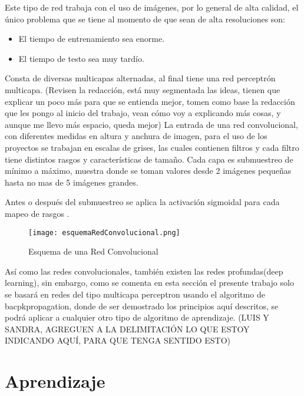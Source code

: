             Este tipo de red trabaja con el uso de imágenes, por lo general de alta calidad, el \'unico problema que se tiene 
            al momento de que sean de alta resoluciones son:
            \begin{itemize}
                \item El tiempo de entrenamiento sea enorme.
                \item El tiempo de testo sea muy tardío.
            \end{itemize}

            Consta de diversas multicapas alternadas, al final tiene una red perceptr\'on multicapa. (Revisen la redacción, está muy segmentada las ideas, tienen que explicar un poco más para que se entienda mejor, tomen como base la redacción que les pongo al inicio del trabajo, vean cómo voy a explicando más cosas, y aunque me llevo más espacio, queda mejor)
            La entrada de una red convolucional, con diferentes medidas en altura y anchura de imagen, para el uso 
            de los proyectos se trabajan en escalas de grises, las cuales contienen filtros y cada filtro tiene distintos 
            rasgos y características de tamaño. Cada capa es submuestreo de m\'inimo a m\'aximo, muestra donde se toman valores 
            desde 2 im\'agenes pequeñas hasta no mas de 5 im\'agenes grandes.

            Antes o despu\'es del submuestreo se aplica la activaci\'on sigmoidal para cada mapeo de rasgos \cite{duran2017}.

            \begin{figure}[H]
                \centering
                \texttt{[image: esquemaRedConvolucional.png]}
                \caption{Esquema de una Red Convolucional \cite{duran2017}}
                \label{fig:fig2}
            \end{figure}

Así como las redes convolucionales, también existen las redes profundas(deep learning), sin embargo, como se comenta en esta sección \label{sec:delimitation} el presente trabajo solo se basará en redes del tipo multicapa perceptron usando el algoritmo de bacpkpropagation, donde de ser demostrado los principios aquí descritos,  se podrá aplicar a cualquier otro tipo de algoritmo de aprendizaje.  (LUIS Y SANDRA, AGREGUEN A LA DELIMITACIÓN LO QUE ESTOY INDICANDO AQUÍ, PARA QUE TENGA SENTIDO ESTO)



\section{Aprendizaje}

